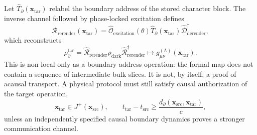 Let \(\widehat T_{\partial}(\bm{x}_{\mathrm{tar}})\) relabel the boundary
address of the stored character block.  The inverse channel followed by
phase-locked excitation defines
\begin{equation}
  \widehat{\mathcal R}_{\mathrm{rerender}}(\bm{x}_{\mathrm{tar}})
  =\widehat{\mathcal O}_{\mathrm{excitation}}(\theta)
  \widehat T_{\partial}(\bm{x}_{\mathrm{tar}})
  \widehat{\mathcal D}_{\mathrm{derender}}^{\dagger},
  \label{eq:rerendering-operator}
\end{equation}
which reconstructs
\begin{equation}
  \rho_{\partial}^{\mathrm{tar}}
  =\widehat{\mathcal R}_{\mathrm{rerender}}
  \rho_{\mathrm{dark}}
  \widehat{\mathcal R}_{\mathrm{rerender}}^{\dagger}
  \longmapsto
  g_{\mu\nu}^{(L)}(\bm{x}_{\mathrm{tar}}).
  \label{eq:rerendered-target-slice}
\end{equation}
This is non-local only as a boundary-address operation: the formal map does
not contain a sequence of intermediate bulk slices.  It is not, by itself, a
proof of acausal transport.  A physical protocol must still satisfy causal
authorization of the target operation,
\begin{equation}
  \bm{x}_{\mathrm{tar}}\in J^+(\bm{x}_{\mathrm{src}}),
  \qquad
  t_{\mathrm{tar}}-t_{\mathrm{src}}
  \geq\frac{d_{\partial}(\bm{x}_{\mathrm{src}},
  \bm{x}_{\mathrm{tar}})}{c},
  \label{eq:rerendering-causal-authorization}
\end{equation}
unless an independently specified causal boundary dynamics proves a stronger
communication channel.